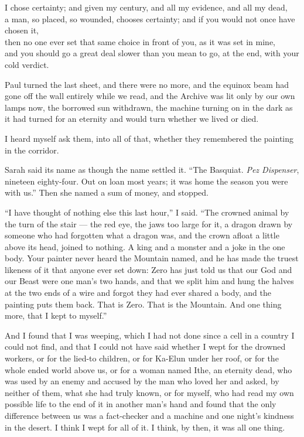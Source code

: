 \begin{scripture}
I chose certainty; and given my century, and all my evidence, and all my dead, \\
a man, so placed, so wounded, chooses certainty; and if you would not once have chosen it, \\
then no one ever set that same choice in front of you, as it was set in mine, \\
and you should go a great deal slower than you mean to go, at the end, with your cold verdict. \\
\end{scripture}

\ornament

Paul turned the last sheet, and there were no more, and the equinox beam had gone off the wall entirely while we read, and the Archive was lit only by our own lamps now, the borrowed sun withdrawn, the machine turning on in the dark as it had turned for an eternity and would turn whether we lived or died.\par

I heard myself ask them, into all of that, whether they remembered the painting in the corridor.\par

Sarah said its name as though the name settled it. ``The Basquiat. \textit{Pez Dispenser}, nineteen eighty-four. Out on loan most years; it was home the season you were with us.'' Then she named a sum of money, and stopped.\par

``I have thought of nothing else this last hour,'' I said. ``The crowned animal by the turn of the stair --- the red eye, the jaws too large for it, a dragon drawn by someone who had forgotten what a dragon was, and the crown afloat a little above its head, joined to nothing. A king and a monster and a joke in the one body. Your painter never heard the Mountain named, and he has made the truest likeness of it that anyone ever set down: Zero has just told us that our God and our Beast were one man's two hands, and that we split him and hung the halves at the two ends of a wire and forgot they had ever shared a body, and the painting puts them back. That is Zero. That is the Mountain. And one thing more, that I kept to myself.''\par

And I found that I was weeping, which I had not done since a cell in a country I could not find, and that I could not have said whether I wept for the drowned workers, or for the lied-to children, or for Ka-Elun under her roof, or for the whole ended world above us, or for a woman named Ithe, an eternity dead, who was used by an enemy and accused by the man who loved her and asked, by neither of them, what she had truly known, or for myself, who had read my own possible life to the end of it in another man's hand and found that the only difference between us was a fact-checker and a machine and one night's kindness in the desert. I think I wept for all of it. I think, by then, it was all one thing.\par

\ornament

